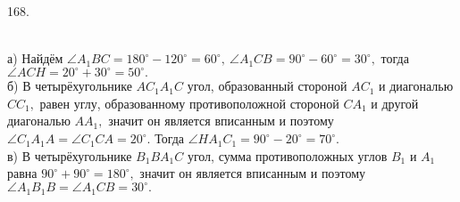 168. \begin{figure}[ht!]
\end{figure}\\
а) Найдём $\angle A_1BC=180^\circ-120^\circ=60^\circ,\ \angle A_1CB=90^\circ-60^\circ=30^\circ,$ тогда $\angle ACH=20^\circ+30^\circ=50^\circ.$\\
б) В четырёхугольнике $AC_1A_1C$ угол, образованный стороной $AC_1$ и диагональю $CC_1,$ равен углу, образованному противоположной стороной $CA_1$ и другой диагональю $AA_1,$ значит он является вписанным и поэтому $\angle C_1A_1A=\angle C_1CA=20^\circ.$ Тогда $\angle HA_1C_1=90^\circ-20^\circ=70^\circ.$\\
в) В четырёхугольнике $B_1BA_1C$ угол, сумма противоположных углов $B_1$ и $A_1$ равна $90^\circ+90^\circ=180^\circ,$ значит он является вписанным и поэтому
$\angle A_1B_1B=\angle A_1CB=30^\circ.$\\
